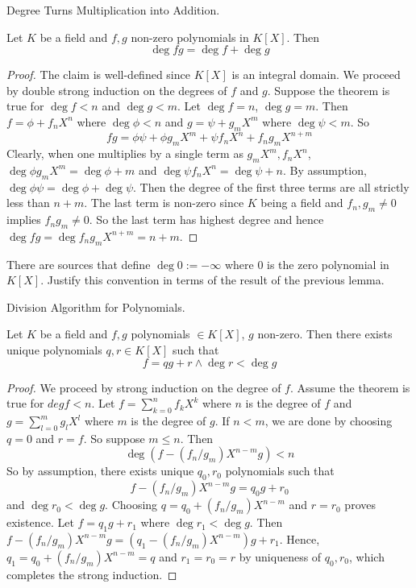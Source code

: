 \documentclass[../book.tex]{subfiles}
\begin{document}
\begin{lem} Degree Turns Multiplication into Addition. 
    
    Let $K$ be a field and $f, g$ non-zero polynomials in $K[X]$. 
    Then \[\deg fg = \deg f + \deg g\]
\end{lem}
\begin{proof}
    The claim is well-defined since $K[X]$ is an integral domain.
    We proceed by double strong induction on the degrees of $f$ and $g$. 
    Suppose the theorem is true for $\deg f < n$ and $\deg g < m$. 
    Let $\deg f = n$, $\deg g = m$. 
    Then $f = \phi + f_n X^n$ where $\deg \phi < n$ and 
    $g = \psi + g_m X^m$ where $\deg \psi < m$. 
    So \[
    fg = \phi \psi + \phi g_m X^m + \psi f_n X^n + f_n g_m X^{n + m}
    \]
    Clearly, when one multiplies by a single term as $g_m X^m, f_n X^n$, 
    $\deg \phi g_m X^m = \deg \phi + m$ and $\deg \psi f_n X^n = \deg \psi + n$.
    By assumption, $\deg \phi\psi = \deg \phi + \deg \psi$.
    Then the degree of the first three terms are all strictly less than $n + m$.
    The last term is non-zero since $K$ being a field and $f_n, g_m \neq 0$
    implies $f_n g_m \neq 0$. 
    So the last term has highest degree and hence
    $\deg fg = \deg f_n g_m X^{n+m} = n + m$. 
\end{proof}
\begin{ex}
    There are sources that define $\deg 0 := -\infty$ where
    $0$ is the zero polynomial in $K[X]$.
    Justify this convention in terms of the result of the previous lemma.
\end{ex}
\begin{lem} Division Algorithm for Polynomials.
    
    Let $K$ be a field and $f, g$ polynomials $\in K[X]$, $g$ non-zero.
    Then there exists unique polynomials $q, r \in K[X]$ such that \[
        f = q g + r \land \deg r < \deg g
    \]
\end{lem}
\begin{proof}
    We proceed by strong induction on the degree of $f$. 
    Assume the theorem is true for $deg f < n$.
    Let $f = \sum_{k = 0}^{n} f_k X^k$ where $n$ is the degree of $f$
    and $g = \sum_{l = 0}^m g_l X^l$ where $m$ is the degree of $g$. 
    If $n < m$, we are done by choosing $q = 0$ and $r = f$.
    So suppose $m \leq n$. 
    Then \[
        \deg (f - (f_n/g_m)X^{n-m} g) < n
    \]
    So by assumption, there exists unique $q_0, r_0$ polynomials such that 
    \[f - (f_n/g_m)X^{n-m} g = q_0 g + r_0\] and $\deg r_0 < \deg g$. 
    Choosing $q = q_0 + (f_n/g_m)X^{n-m}$ and $r = r_0$ proves existence.
    Let $f = q_1 g + r_1$ where $\deg r_1 < \deg g$. 
    Then $f - (f_n/g_m)X^{n-m}g = (q_1 - (f_n/g_m)X^{n-m}) g + r_1$.
    Hence, $q_1 = q_0 + (f_n/g_m)X^{n-m} = q$ 
    and $r_1 = r_0 = r$ by uniqueness of $q_0, r_0$,
    which completes the strong induction. 
\end{proof}
\end{document}
